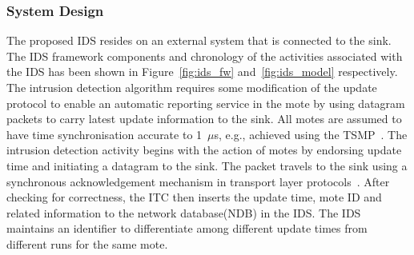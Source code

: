 \documentclass[conference]{IEEEtran}
\begin{document}
\subsubsection*{System Design}
The proposed IDS resides on an external system that is connected to the sink.
The IDS framework components and chronology of the activities associated with the IDS has been shown in Figure~\ref{fig:ids_fw} and~\ref{fig:ids_model} respectively.
The intrusion detection algorithm requires some modification of the update protocol to enable an automatic reporting service in the mote by using datagram packets to carry latest update information to the sink.
All motes are assumed to have time synchronisation accurate to 1~$\mu$s, e.g., achieved using the TSMP~\cite{Pister08tsmp:time}.
The intrusion detection activity begins with the action of motes by endorsing update time and initiating a datagram to the sink. 
The packet travels to the sink using a synchronous acknowledgement mechanism in transport layer protocols~\cite{tep116}.
After checking for correctness, the ITC then inserts the update time, mote ID and related information to the network database(NDB) in the IDS.
The IDS maintains an identifier to differentiate among different update times from different runs for the same mote.
\end{document}
